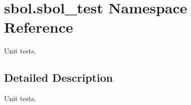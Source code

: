 \hypertarget{namespacesbol_1_1sbol__test}{}\section{sbol.\+sbol\+\_\+test Namespace Reference}
\label{namespacesbol_1_1sbol__test}


Unit tests.  




\subsection{Detailed Description}
Unit tests. 